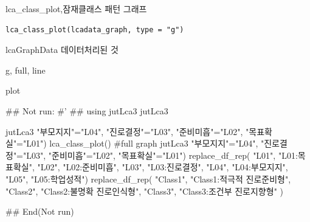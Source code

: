 \documentclass[a4paper]{book}
\begin{document}
%
\begin{Description}
lca\_class\_plot,잠재클래스 패턴 그래프
\end{Description}
%
\begin{Usage}
\begin{verbatim}
lca_class_plot(lcadata_graph, type = "g")
\end{verbatim}
\end{Usage}
%
\begin{Arguments}
\begin{ldescription}
\item[\code{lcadata\_graph}] lcaGraphData 데이터처리된 것

\item[\code{type}] g, full, line
\end{ldescription}
\end{Arguments}
%
\begin{Value}
plot
\end{Value}
%
\begin{Examples}
\begin{ExampleCode}
\#\# Not run: 
#'
## using
jutLca3 %
jutLca3 %

jutLca3 %
                         "부모지지"="L04",
                         "진로결정"="L03",
                         "준비미흡"="L02",
                         "목표확실"="L01") %
  lca_class_plot()
#full graph
jutLca3 %
                         "부모지지"="L04",
                         "진로결정"="L03",
                         "준비미흡"="L02",
                         "목표확실"="L01") %
  replace_df_rep(
    "L01", "L01:목표확실",
    "L02", "L02:준비미흡",
    "L03", "L03:진로결정",
    "L04", "L04:부모지지",
    "L05", "L05:학업성적")%
  replace_df_rep(
    "Class1", "Class1:적극적 진로준비형",
    "Class2", "Class2:불명확 진로인식형",
    "Class3", "Class3:조건부 진로지향형"
  )%


## End(Not run)
\end{ExampleCode}
\end{Examples}
\end{document}
